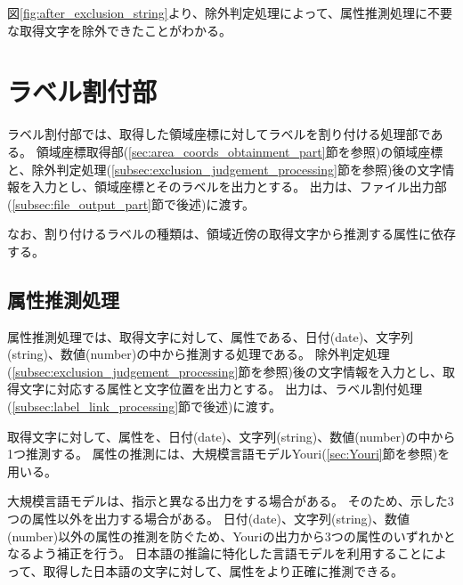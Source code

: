 図\ref{fig:after_exclusion_string}より、除外判定処理によって、属性推測処理に不要な取得文字を除外できたことがわかる。

\section{ラベル割付部}\label{sec:label_link_part}
ラベル割付部では、取得した領域座標に対してラベルを割り付ける処理部である。
領域座標取得部(\ref{sec:area_coords_obtainment_part}節を参照)の領域座標と、除外判定処理(\ref{subsec:exclusion_judgement_processing}節を参照)後の文字情報を入力とし、領域座標とそのラベルを出力とする。
出力は、ファイル出力部(\ref{subsec:file_output_part}節で後述)に渡す。

なお、割り付けるラベルの種類は、領域近傍の取得文字から推測する属性に依存する。

\subsection{属性推測処理}\label{subsec:att_prediction_processing}
属性推測処理では、取得文字に対して、属性である、日付(date)、文字列(string)、数値(number)の中から推測する処理である。
除外判定処理(\ref{subsec:exclusion_judgement_processing}節を参照)後の文字情報を入力とし、取得文字に対応する属性と文字位置を出力とする。
出力は、ラベル割付処理(\ref{subsec:label_link_processing}節で後述)に渡す。

取得文字に対して、属性を、日付(date)、文字列(string)、数値(number)の中から1つ推測する。
属性の推測には、大規模言語モデルYouri(\ref{sec:Youri}節を参照)を用いる。

大規模言語モデルは、指示と異なる出力をする場合がある。
そのため、示した3つの属性以外を出力する場合がある。
日付(date)、文字列(string)、数値(number)以外の属性の推測を防ぐため、Youriの出力から3つの属性のいずれかとなるよう補正を行う。
日本語の推論に特化した言語モデルを利用することによって、取得した日本語の文字に対して、属性をより正確に推測できる。

